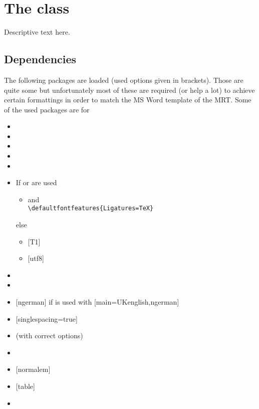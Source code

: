 \chapter{The  class}
Descriptive text here.

\section{Dependencies}
The following packages are loaded (used options given in brackets). Those are
quite some but unfortunately most of these are required (or help a lot) to
achieve certain formattings in order to match the MS Word template of the MRT.
Some of the used packages are for 
\vspace*{-\multicolsep}%
\begin{multicols}{2}%
  \begin{itemize}
    \item {}
    \item {}
    \item {}
    \item {}
    \item {}
    \item If  or  are used
      \begin{itemize}[topsep=0pt]
        \item {} and\\\verb|\defaultfontfeatures{Ligatures=TeX}|
      \end{itemize}
      else
      \begin{itemize}[topsep=0pt]
        \item {} [T1]
        \item {} [utf8]
      \end{itemize}
    \item {}
    \item {}
    \item {} [ngerman] if  is used with
      [main=UKenglish,ngerman]
    \item {} [singlespacing=true]
    \item {} (with correct options)
    \item {}
    \item {} [normalem]
    \item {} [table]
    \item {}

\end{itemize}
\end{multicols}
